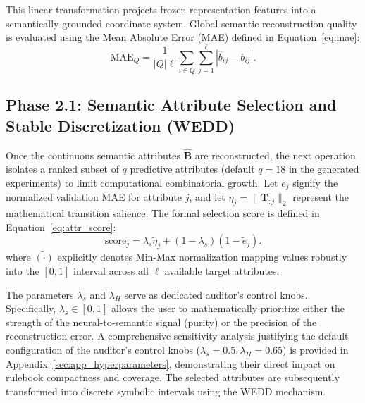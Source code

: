 \documentclass[make,article,submit,pdftex,moreauthors]{Definitions/mdpi}
\newcommand{\hatB}{\widehat{\mathbf{B}}}
\newcommand{\matT}{\mathbf{T}}
\begin{document}
This linear transformation projects frozen representation features into a semantically grounded coordinate system. Global semantic reconstruction quality is evaluated using the Mean Absolute Error (MAE) defined in Equation~\eqref{eq:mae}:
\begin{equation}
 \label{eq:mae}
 \mathrm{MAE}_Q = \frac{1}{|Q|\ell} \sum_{i \in Q} \sum_{j=1}^{\ell} |\hat{b}_{ij} - b_{ij}|.
\end{equation}

\subsection{Phase 2.1: Semantic Attribute Selection and Stable Discretization (WEDD)}
\label{subsec:methods_wedd}

Once the continuous semantic attributes $\hatB$ are reconstructed, the next operation isolates a ranked subset of $q$ predictive attributes (default $q=18$ in the generated experiments) to limit computational combinatorial growth. Let $e_j$ signify the normalized validation MAE for attribute $j$, and let $\eta_j = \|\matT_{:j}\|_2$ represent the mathematical transition salience. The formal selection score is defined in Equation~\eqref{eq:attr_score}:
\begin{equation}
 \label{eq:attr_score}
 \mathrm{score}_j = \lambda_s\widetilde{\eta}_j + (1-\lambda_s)(1-\widetilde{e}_j).
\end{equation}
where $\widetilde{(\cdot)}$ explicitly denotes Min-Max normalization mapping values robustly into the $[0,1]$ interval across all $\ell$ available target attributes. 

The parameters $\lambda_s$ and $\lambda_H$ serve as dedicated auditor's control knobs. Specifically, $\lambda_s \in [0,1]$ allows the user to mathematically prioritize either the strength of the neural-to-semantic signal (purity) or the precision of the reconstruction error. A comprehensive sensitivity analysis justifying the default configuration of the auditor's control knobs ($\lambda_s = 0.5, \lambda_H = 0.65$) is provided in Appendix~\ref{sec:app_hyperparameters}, demonstrating their direct impact on rulebook compactness and coverage. The selected attributes are subsequently transformed into discrete symbolic intervals using the WEDD mechanism. 
\end{document}
